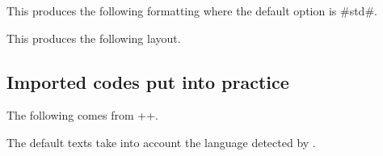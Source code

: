 

\begin{tdocexa}[Following]
    \leavevmode

    \begin{tdoclatex}[code]

    \end{tdoclatex}

    This produces the following formatting where the default option is \tdocinlatex#std#.


\end{tdocexa}




\begin{tdocexa}
    \leavevmode

    \begin{tdoclatex}[code]

    \end{tdoclatex}

    This produces the following layout.


\end{tdocexa}




\subsection{Imported codes put into practice}
\label{tutodoc-latexshow}

\begin{tdocexa}[Showcase]
    The following comes from \tdocinlatex++.

    \medskip

    \begin{tdocshowcaseDOC}

    \end{tdocshowcaseDOC}
\end{tdocexa}


\begin{tdocnote}
    The default texts take into account the language detected by \thisproj.
\end{tdocnote}


